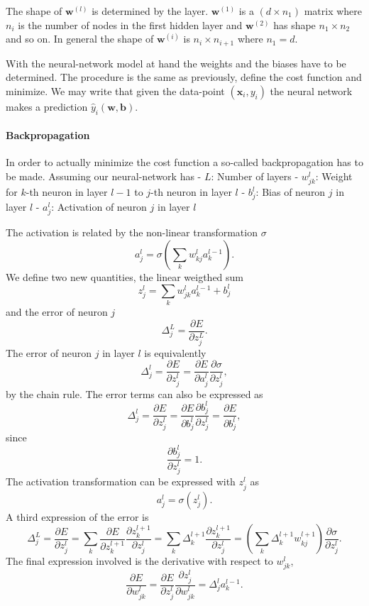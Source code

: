 \documentclass[10pt, t]{beamer}
\begin{document}
The shape of \(\boldsymbol{w}^{(l)}\) is determined by the layer.
\(\boldsymbol{w}^{(1)}\) is a \((d\times n_1)\) matrix where \(n_i\) is
the number of nodes in the first hidden layer and
\(\boldsymbol{w}^{(2)}\) has shape \(n_1\times n_2\) and so on. In
general the shape of \(\boldsymbol{w}^{(i)}\) is \(n_i \times n_{i+1}\)
where \(n_1=d\).

With the neural-network model at hand the weights and the biases have to
be determined. The procedure is the same as previously, define the cost
function and minimize. We may write that given the data-point
\((\boldsymbol{x}_i, y_i)\) the neural network makes a prediction
\(\hat{y}_i(\boldsymbol{w},\boldsymbol{b})\).

\hypertarget{backpropagation}{%
\paragraph{Backpropagation}\label{backpropagation}}

In order to actually minimize the cost function a so-called
backpropagation has to be made. Assuming our neural-network has - \(L\):
Number of layers - \(w^l_{jk}\): Weight for \(k\)-th neuron in layer
\(l-1\) to \(j\)-th neuron in layer \(l\) - \(b^l_j\): Bias of neuron
\(j\) in layer \(l\) - \(a^l_j\): Activation of neuron \(j\) in layer
\(l\)

The activation is related by the non-linear transformation \(\sigma\)
\[a^l_j = \sigma\left(\sum_k w^l_{kj}a^{l-1}_k\right).\] We define two
new quantities, the linear weigthed sum
\[z^l_j = \sum_kw^l_{jk}a^{l-1}_k + b^l_j\] and the error of neuron
\(j\) \[\Delta^L_j = \frac{\partial E}{\partial z^L_j}.\] The error of
neuron \(j\) in layer \(l\) is equivalently
\[\Delta^l_j = \frac{\partial E}{\partial z^l_j} = \frac{\partial E}{\partial a^l_j}\frac{\partial \sigma}{\partial z^l_j},\]
by the chain rule. The error terms can also be expressed as
\[\Delta^l_j = \frac{\partial E}{\partial z^l_j} = \frac{\partial E}{\partial b^l_j}\frac{\partial b^l_j}{\partial z^l_j} = \frac{\partial E}{\partial b^l_j},\]
since \[\frac{\partial b^l_j}{\partial z^l_j} = 1.\] The activation
transformation can be expressed with \(z^l_j\) as
\[a^l_j = \sigma\left(z^l_j\right).\] A third expression of the error is
\[\Delta^L_j = \frac{\partial E}{\partial z^l_j} = \sum_k \frac{\partial E}{\partial z^{l+1}_k}\frac{\partial z^{l+1}_k}{\partial z^l_j} = \sum_k \Delta^{l+1}_k\frac{\partial z^{l+1}_k}{\partial z^l_j} = \left(\sum_k\Delta^{l+1}_kw^{l+1}_{kj}\right)\frac{\partial \sigma}{\partial z^l_j}.\]
The final expression involved is the derivative with respect to
\(w^l_{jk}\),
\[\frac{\partial E}{\partial w^l_{jk}} = \frac{\partial E}{\partial z^l_j}\frac{\partial z^l_j}{\partial w^l_{jk}} = \Delta^l_ja^{l-1}_k.\]
\end{document}
